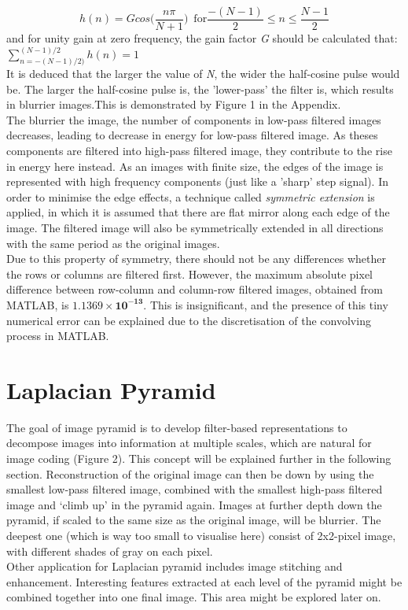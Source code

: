 \documentclass[a4paper, 11pt]{article}
\begin{document}
\begin{equation*}
\mathit{h(n) = G cos \big( \frac{n \pi}{N+1} \big)} \, \, \, \mathrm{for} \mathit{\frac{-(N-1)}{2} \leq n \leq \frac{N-1}{2}}
\end{equation*}
\noindent
and for unity gain at zero frequency, the gain factor \textit{G} should be calculated that: $ \sum\limits_{n=-(N-1)/2)}^{(N-1)/2} h(n) = 1 $ \\
\noindent
It is deduced that the larger the value of \textit{N}, the wider the half-cosine pulse would be. The larger the half-cosine pulse is, the 'lower-pass' the filter is, which results in blurrier images.This is demonstrated by Figure 1 in the Appendix. \\
\noindent
The blurrier the image, the number of components in low-pass filtered images decreases, leading to decrease in energy for low-pass filtered image. As theses components are filtered into high-pass filtered image, they contribute to the rise in energy here instead.
\noindent
As an images with finite size, the edges of the image is represented with high frequency components (just like a 'sharp' step signal). In order to minimise the edge effects, a technique called \textit{symmetric extension} is applied, in which it is assumed that there are flat mirror along each edge of the image. The filtered image will also be symmetrically extended in all directions with the same period as the original images. \\
\noindent
Due to this property of symmetry, there should not be any differences whether the rows or columns are filtered first. However, the maximum absolute pixel difference between row-column and column-row filtered images, obtained from MATLAB, is $\mathbf{1.1369\times10^{-13}}$. This is insignificant, and the presence of this tiny numerical error can be explained due to the discretisation of the convolving process in MATLAB. 
\section{Laplacian Pyramid}
The goal of image pyramid is to develop filter-based representations to decompose images into information at multiple scales, which are natural for image coding (Figure 2). This concept will be explained further in the following section. Reconstruction of the original image can then be down by using the smallest low-pass filtered image, combined with the smallest high-pass filtered image and `climb up' in the pyramid again. Images at further depth down the pyramid, if scaled to the same size as the original image, will be blurrier. The deepest one (which is way too small to visualise here) consist of 2x2-pixel image, with different shades of gray on each pixel. \\
\noindent
Other application for Laplacian pyramid includes image stitching and enhancement. Interesting features extracted at each level of the pyramid might be combined together into one final image. This area might be explored later on. 
\end{document}
